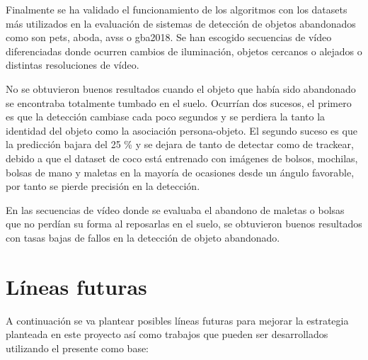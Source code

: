 Finalmente se ha validado el funcionamiento de los algoritmos con los datasets más utilizados en la evaluación de sistemas de detección de objetos abandonados como son \gls{pets}, \gls{aboda}, \gls{avss} o \gls{gba2018}. Se han escogido secuencias de vídeo diferenciadas donde ocurren cambios de iluminación, objetos cercanos o alejados o distintas resoluciones de vídeo.

No se obtuvieron buenos resultados cuando el objeto que había sido abandonado se encontraba totalmente tumbado en el suelo. Ocurrían dos sucesos, el primero es que la detección cambiase cada poco segundos y se perdiera la tanto la identidad del objeto como la asociación persona-objeto. El segundo suceso es que la predicción bajara del 25 \% y se dejara de tanto de detectar como de trackear, debido a que el dataset de \gls{coco} está entrenado con imágenes de bolsos, mochilas, bolsas de mano y maletas en la mayoría de ocasiones desde un ángulo favorable, por tanto se pierde precisión en la detección.

En las secuencias de vídeo donde se evaluaba el abandono de maletas o bolsas que no perdían su forma al reposarlas en el suelo, se obtuvieron buenos resultados con tasas bajas de fallos en la detección de objeto abandonado.

\section{Líneas futuras}
\label{sec:lineas-futuras}

A continuación se va plantear posibles líneas futuras para mejorar la estrategia planteada en este proyecto así como trabajos que pueden ser desarrollados utilizando el presente como base: 

